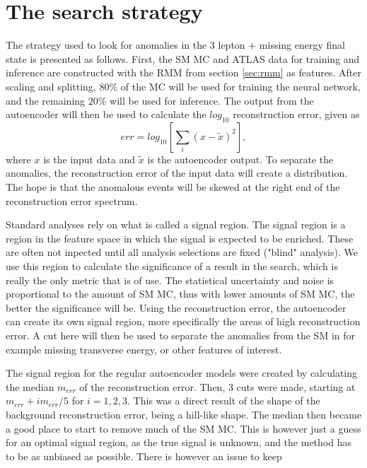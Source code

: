 \section{The search strategy}\label{sec:strategy}
The strategy used to look for anomalies in the 3 lepton + missing energy final state is presented as follows. 
First, the SM MC and ATLAS data for training and inference are constructed with the RMM from section 
\ref{sec:rmm} as features. After scaling and splitting, $80\%$ of the MC will be used for training the neural 
network, and the remaining $20\%$ will be used for inference. The output from the autoencoder will then be used 
to calculate the $log_{10}$ reconstruction error, given as 
\begin{equation}\label{eq:rec_err}
    err = log_{10}\left[ \sum_i (x-\tilde{x})^2\right],
\end{equation}
where $x$ is the input data and $\tilde{x}$ is the autoencoder output. To separate the anomalies, the reconstruction 
error of the input data will create a distribution. The hope is that the anomalous events will 
be skewed at the right end of the reconstruction error spectrum.\par
Standard analyses rely on what is called a signal region. The signal region is a region in the feature space in which
the signal is expected to be enriched. These are often not inpected until all analysis selections are fixed ("blind" analysis). 
We use this region to calculate the significance of a result in the search, which is 
really the only metric that is of use. The statistical uncertainty and noise is proportional to the amount of SM MC, 
thus with lower amounts of SM MC, the better the significance will be. Using the reconstruction error, the autoencoder 
can create its own signal region, more specifically the areas of high reconstruction error. A cut here will then be used to 
separate the anomalies from the SM in for example missing transverse energy, or other features of interest. \par 
The signal region for the regular autoencoder models were created by calculating the median $m_{err}$ of the 
reconstruction error. Then, 3 cuts were made, starting at $m_{err} + im_{err}/5$ for $i = 1,2,3$. This was a direct 
result of the shape of the background reconstruction error, being a hill-like shape. The median then became a 
good place to start to remove much of the SM MC. This is however just a guess for an optimal signal region, 
as the true signal is unknown, and the method has to be as unbiased as possible. There is however an issue to keep 
